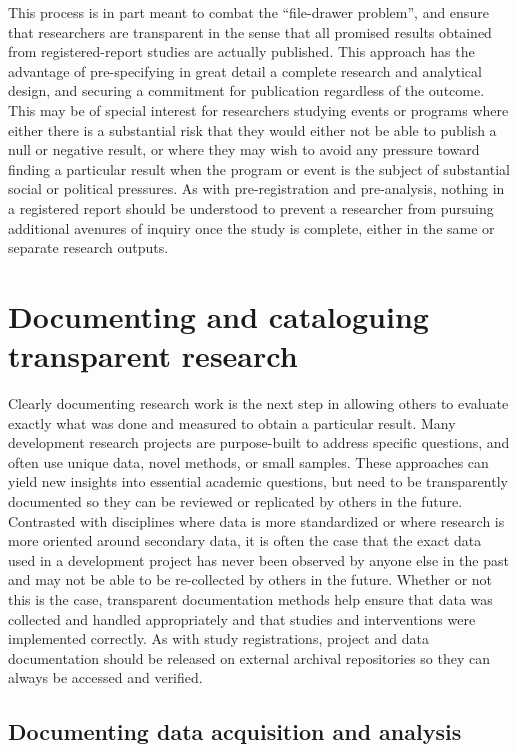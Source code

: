 This process is in part meant to combat the ``file-drawer problem'',\cite{simonsohn2014p}
and ensure that researchers are transparent in the sense that
all promised results obtained from registered-report studies are actually published.
This approach has the advantage of pre-specifying in great detail
a complete research and analytical design,
and securing a commitment for publication regardless of the outcome.
This may be of special interest for researchers
studying events or programs where either there is a substantial risk
that they would either not be able to publish a null or negative result,
or where they may wish to avoid any pressure toward finding a particular result
when the program or event is the subject of substantial social or political pressures.
As with pre-registration and pre-analysis,
nothing in a registered report should be understood
to prevent a researcher from pursuing additional avenures of inquiry
once the study is complete, either in the same or separate research outputs.

\section{Documenting and cataloguing transparent research}

Clearly documenting research work is the next step
in allowing others to evaluate exactly what was done and measured
to obtain a particular result.
Many development research projects are purpose-built
to address specific questions,
and often use unique data, novel methods, or small samples.
These approaches can yield new insights into essential academic questions,
but need to be transparently documented so they can be reviewed
or replicated by others in the future.\cite{duvendack2017meant}
Contrasted with disciplines where data is more standardized
or where research is more oriented around secondary data,
it is often the case that the exact data used in a development project
has never been observed by anyone else in the past
and may not be able to be re-collected by others in the future.
Whether or not this is the case,
transparent documentation methods help ensure
that data was collected and handled appropriately
and that studies and interventions were implemented correctly.
As with study registrations, project and data documentation
should be released on external archival repositories
so they can always be accessed and verified.

\subsection{Documenting data acquisition and analysis}

